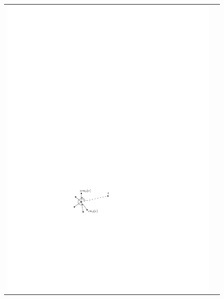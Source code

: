 \documentclass [letterpaper] {patmorin}
\begin{document}
\begin{figure}
  \begin{center}
    \begin{tabular}{cc}
    \includegraphics{pics/random-compass} &

\end{tabular}
\end{center}
\end{figure}
\end{document}
